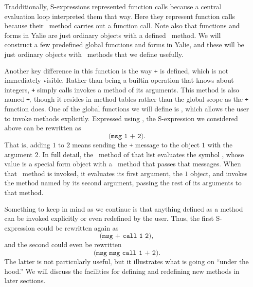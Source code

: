 \documentclass[twocolumn]{article}
\begin{document}
Tradditionally, S-expressions represented function calls because a
central evaluation loop interpreted them that way. Here they represent
function calls because their \eval\ method carries out a
function call. Note also that functions and forms in Yalie are just
ordinary objects with a defined \call\ method. We will
construct a few predefined global functions and forms in Yalie, and
these will be just ordinary objects with \call\ methods that we
define usefully.

Another key difference in this function is the way \texttt{+} is
defined, which is not immediately visible. Rather than being a builtin
operation that knows about integers, \texttt{+} simply calls invokes a
method of its arguments. This method is also named \texttt{+}, though
it resides in method tables rather than the global scope as the
\texttt{+} function does. One of the global functions we will define
is \msg, which allows the user to invoke methods explicitly. Expressed
using \msg, the S-expression we considered above can be rewritten as
\[\texttt{(msg 1 + 2)}.\]
That is, adding $1$ to $2$ means sending the \texttt{+} message to the
object $1$ with the argument $2$. In full detail, the \eval\ method of
that list evaluates the symbol \msg, whose value is a special form
object with a \call\ method that passes that messages. When that \call\
method is invoked, it evaluates its first argument, the $1$ object,
and invokes the method named by its second argument, passing the rest
of its arguments to that method.

Something to keep in mind as we continue is that anything defined as a
method can be invoked explicitly or even redefined by the user. Thus,
the first S-expression could be rewritten again as
\[ \texttt{(msg + call 1 2)}, \]
and the second could even be rewritten
\[ \texttt{(msg msg call 1 + 2)}. \] The latter is not particularly
useful, but it illustrates what is going on ``under the hood.'' We
will discuss the facilities for defining and redefining new methods in
later sections.
\end{document}
